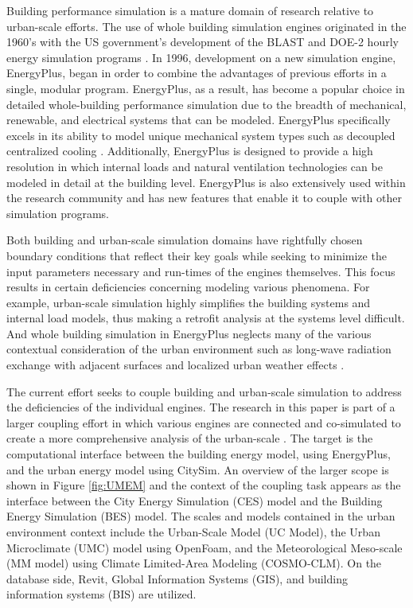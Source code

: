 \documentclass{tBPS2e}
\theoremstyle{plain}
\theoremstyle{definition}
\theoremstyle{remark}
\begin{document}
Building performance simulation is a mature domain of research relative to
urban-scale efforts. The use of whole building simulation engines originated
in the 1960's with the US government's development of the BLAST and DOE-2
hourly energy simulation programs \citep{lawrie_energyplus:_2001}. In 1996, development
on a new simulation engine, EnergyPlus, began in order to combine the
advantages of previous efforts in a single, modular program. EnergyPlus, as a
result, has become a popular choice in detailed whole-building performance
simulation due to the breadth of mechanical, renewable, and electrical systems
that can be modeled. EnergyPlus specifically excels in its ability to model
unique mechanical system types such as decoupled centralized cooling
\citep{miller_modeling_2010}. Additionally, EnergyPlus is designed to provide a high
resolution in which internal loads and natural ventilation technologies can be
modeled in detail at the building level. EnergyPlus is also extensively used within the
research community and has new features that enable it to couple with other simulation programs.

Both building and urban-scale simulation domains have rightfully chosen
boundary conditions that reflect their key goals while seeking to minimize the
input parameters necessary and run-times of the engines themselves. This focus
results in certain deficiencies concerning modeling various phenomena.
For example, urban-scale simulation highly simplifies the building systems and
internal load models, thus making a retrofit analysis at the systems level
difficult. And whole building simulation in EnergyPlus neglects many of the
various contextual consideration of the urban environment such as long-wave
radiation exchange with adjacent surfaces and localized urban weather effects
\citep{lawrie_energyplus:_2001}.

The current
effort seeks to couple building and urban-scale simulation to address the deficiencies 
of the individual engines. The research in
this paper is part of a larger coupling effort in which various engines are
connected and co-simulated to create a more comprehensive analysis of the
urban-scale \citep{dorer_modelling_2013,allegrini_influence_2012}. The target is the
computational interface between the building energy model, using EnergyPlus,
and the urban energy model using CitySim. An overview of the larger scope is
shown in Figure \ref{fig:UMEM} and the context of the coupling task appears as 
the interface between the City Energy Simulation (CES) model and the
Building Energy Simulation (BES) model. The scales and models contained in the 
urban environment context include the Urban-Scale Model (UC Model), the Urban 
Microclimate (UMC) model using OpenFoam, and the Meteorological Meso-scale (MM model) 
using Climate Limited-Area Modeling (COSMO-CLM). On the database side, Revit, Global 
Information Systems (GIS), and building information systems (BIS) are utilized.
\end{document}
